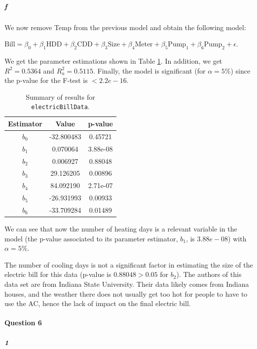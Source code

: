 \documentclass[]{article}
\let\oldparagraph\paragraph
\renewcommand{\paragraph}[1]{\oldparagraph{#1}\mbox{}}
\let\oldsubparagraph\subparagraph
\renewcommand{\subparagraph}[1]{\oldsubparagraph{#1}\mbox{}}
\begin{document}
\subparagraph{\Large f}\normalsize

We now remove Temp from the previous model and obtain the following model:

$\text{Bill} = \beta_0 + \beta_1 \text{HDD}+ \beta_2 \text{CDD}+ \beta_3 \text{Size} + \beta_4 \text{Meter} + \beta_5 \text{Pump}_1 + \beta_6 \text{Pump}_2 + \epsilon$.

We get the parameter estimations shown in Table \ref{q5f}. In addition, we get $R^2 = 0.5364$ and $R^2_a = 0.5115$. Finally, the model is significant (for $\alpha = 5\%$) since the p-value for the F-test is $< 2.2e-16$.

\begin{table}[!ht]
\caption{Summary of results for \texttt{electricBillData}.}
\begin{center}
\begin{tabular}{|c|c|c|}
\hline
Estimator & Value & p-value \\
\hline
$b_0$ & -32.800483 & 0.45721 \\
$b_1$ & 0.070064 & 3.88e-08 \\
$b_2$ & 0.006927 & 0.88048 \\
$b_3$ & 29.126205 & 0.00896 \\
$b_4$ & 84.092190 & 2.71e-07 \\
$b_5$ & -26.931993 & 0.00933 \\
$b_6$ & -33.709284 & 0.01489 \\
\hline
\end{tabular}
\end{center}
\label{q5f}
\end{table}

We can see that now the number of heating days is a relevant variable in the model (the p-value associated to its parameter estimator, $b_1$, is $3.88e-08$) with $\alpha = 5\%$.

The number of cooling days is not a significant factor in estimating the size of the electric bill for this data (p-value is $0.88048 > 0.05$ for $b_2$). The authors of this data set are from Indiana State University. Their data likely comes from Indiana houses, and the weather there does not usually get too hot for people to have to use the AC, hence the lack of impact on the final electric bill.

\paragraph{\Large Question 6}\normalsize
\subparagraph{\Large 1}\normalsize
\end{document}
